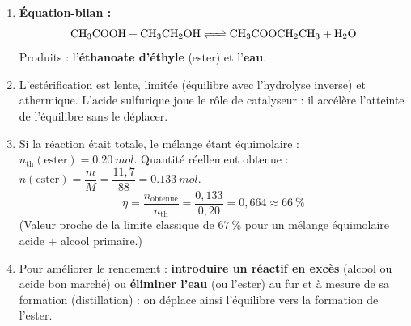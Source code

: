 \documentclass[11pt]{article}
\newcommand{\cle}[1]{{\popxbold\color{popdark}#1}}
\begin{document}
\begin{corrige}
\begin{enumerate}
\item \textbf{Équation-bilan :}
\[ \ce{CH3COOH + CH3CH2OH <=> CH3COOCH2CH3 + H2O} \]
Produits : l'\textbf{éthanoate d'éthyle} (ester) et l'\textbf{eau}.
\item L'estérification est \cle{lente}, \cle{limitée} (équilibre avec l'hydrolyse inverse) et \cle{athermique}. L'acide sulfurique joue le rôle de \cle{catalyseur} : il accélère l'atteinte de l'équilibre sans le déplacer.
\item Si la réaction était totale, le mélange étant équimolaire : $n_{\text{th}}(\text{ester}) = \SI{0,20}{mol}$.
Quantité réellement obtenue : $n(\text{ester}) = \dfrac{m}{M} = \dfrac{11{,}7}{88} = \SI{0,133}{mol}$.
\[ \eta = \frac{n_{\text{obtenue}}}{n_{\text{th}}} = \frac{0{,}133}{0{,}20} = 0{,}664 \approx \boxed{66\ \%} \]
(Valeur proche de la limite classique de $67\ \%$ pour un mélange équimolaire acide + alcool primaire.)
\item Pour améliorer le rendement : \textbf{introduire un réactif en excès} (alcool ou acide bon marché) ou \textbf{éliminer l'eau} (ou l'ester) au fur et à mesure de sa formation (distillation) : on déplace ainsi l'équilibre vers la formation de l'ester.
\end{enumerate}
\end{corrige}
\end{document}
